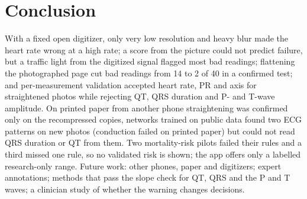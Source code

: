 \documentclass[conference]{IEEEtran}
\begin{document}
\section{Conclusion}
With a fixed open digitizer, only very low resolution and heavy blur made the heart rate wrong at a high rate; a score from the picture could not predict failure, but a traffic light from the digitized signal flagged most bad readings; flattening the photographed page cut bad readings from 14 to 2 of 40 in a confirmed test; and per-measurement validation accepted heart rate, PR and axis for straightened photos while rejecting QT, QRS duration and P- and T-wave amplitude. On printed paper from another phone straightening was confirmed only on the recompressed copies, networks trained on public data found two ECG patterns on new photos (conduction failed on printed paper) but could not read QRS duration or QT from them. Two mortality-risk pilots failed their rules and a third missed one rule, so no validated risk is shown; the app offers only a labelled research-only range. Future work: other phones, paper and digitizers; expert annotations; methods that pass the slope check for QT, QRS and the P and T waves; a clinician study of whether the warning changes decisions.



\end{document}
